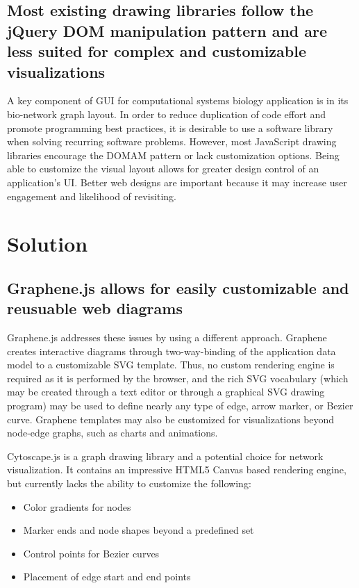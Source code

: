 \subsection{Most existing drawing libraries follow the jQuery DOM manipulation pattern and are less suited for complex and customizable visualizations}
A key component of GUI for computational systems biology application is in its bio-network graph layout.
In order to reduce duplication of code effort and promote programming best practices, it is desirable to use a software library when solving recurring software problems.
However, most JavaScript drawing libraries encourage the DOMAM pattern or lack customization options.
Being able to customize the visual layout allows for greater design control of an application's UI. 
Better web designs are important because it may increase user engagement and likelihood of revisiting. \autocite{rosen2004website}


\section{Solution}

\subsection{Graphene.js allows for easily customizable and reusuable web diagrams}
Graphene.js addresses these issues by using a different approach.
Graphene creates interactive diagrams through two-way-binding of the application data model to a customizable SVG template.
Thus, no custom rendering engine is required as it is performed by the browser, and the rich SVG vocabulary (which may be created through a text editor or through a graphical SVG drawing program) may be used to define nearly any type of edge, arrow marker, or Bezier curve.
Graphene templates may also be customized for visualizations beyond node-edge graphs, such as charts and animations.


Cytoscape.js \autocite{cytoscape2014js} is a graph drawing library and a potential choice for network visualization. 
It contains an impressive HTML5 Canvas based rendering engine, but currently lacks the ability to customize the following:

\begin{itemize}
\item Color gradients for nodes
\item Marker ends and node shapes beyond a predefined set
\item Control points for Bezier curves
\item Placement of edge start and end points
\end{itemize}

